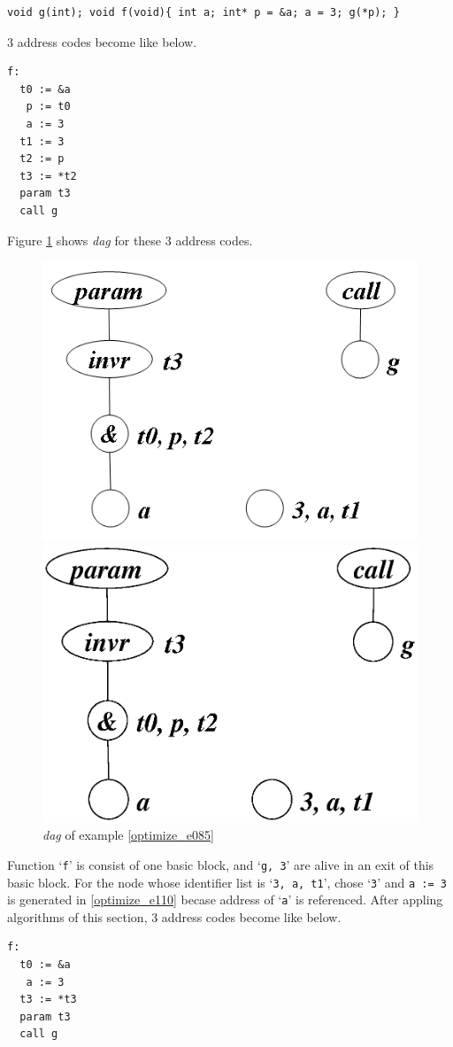 \begin{Example}
\label{optimize_e085}
\begin{verbatim}
void g(int); void f(void){ int a; int* p = &a; a = 3; g(*p); }
\end{verbatim}
3 address codes become like below.
\begin{verbatim}
f:
  t0 := &a
   p := t0
   a := 3
  t1 := 3
  t2 := p
  t3 := *t2
  param t3
  call g
\end{verbatim}
Figure \ref{optimize_e086} shows {\em dag} for these 3 address codes.
\begin{figure}[htbp]
\begin{center}
\begin{htmlonly}
\includegraphics[width=0.7\linewidth,height=0.529\linewidth]{opt036.png}
\end{htmlonly}
\begin{latexonly}
\includegraphics[width=0.7\linewidth,height=0.529\linewidth]{opt036.eps}
\end{latexonly}
\caption{{\em dag} of example \ref{optimize_e085}}
\label{optimize_e086}
\end{center}
\end{figure}
Function `{\tt{f}}' is consist of one basic block,
and `{\tt{g, 3}}' are alive in an exit of this basic block.
For the node whose identifier list is `{\tt{3, a, t1}}',
chose `{\tt{3}}' and {\tt{a := 3}} is generated in 
\ref{optimize_e110} becase address of `{\tt{a}}' is referenced.
After appling algorithms of this section,
3 address codes become like below.
\begin{verbatim}
f:
  t0 := &a
   a := 3
  t3 := *t3
  param t3
  call g
\end{verbatim}
\end{Example}

